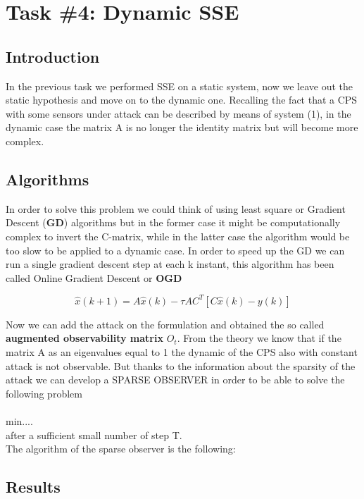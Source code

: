 
\section*{Task \#4: Dynamic SSE}
    \subsection*{Introduction}
    In the previous task we performed SSE on a static system, now we leave out the static hypothesis and move on to the dynamic one.
    Recalling the fact that a CPS with some sensors under attack can be described by means of system (1), in the dynamic case the matrix A is no longer the identity matrix but will become more complex.
    \subsection*{Algorithms}
    In order to solve this problem we could think of using least square or Gradient Descent (\textbf{GD}) algorithms but in the former case it might be computationally complex to invert the C-matrix, while in the latter case the algorithm would be too slow to be applied to a dynamic case.
    In order to speed up the GD we can run a single gradient descent step at each k instant, this algorithm has been called Online Gradient Descent or \textbf{OGD} 

    $$\hat{x}(k+1) = A\hat{x}(k) - \tau AC^T[C\hat{x}(k) - y(k)]$$

    Now we can add the attack on the formulation and obtained the so called \textbf{augmented observability matrix} $O_t$. From the theory we know that if the matrix A as an eigenvalues equal to 1 the dynamic of the CPS also with constant attack is not observable.
    But thanks to the information about the sparsity of the attack we can develop a SPARSE OBSERVER in order to be able to solve the following problem \\
    \\min....
    \\after a sufficient small number of step T.
    \\The algorithm of the sparse observer is the following:
    
    
    \subsection*{Results}